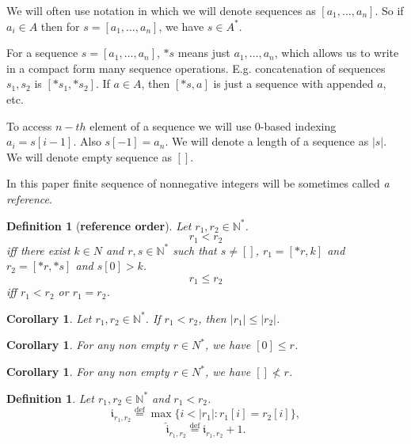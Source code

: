 \documentclass[10pt]{article}
\theoremstyle{plain}
\newtheorem{definition}[theorem]{Definition}
\newtheorem{corollary}[theorem]{Corollary}
\newcommand{\defeq}{\stackrel{\mathrm{def}}{=}}
\renewcommand{\i}{\mathfrak{i}}
\newcommand{\ii}{\hat{\mathfrak{i}}}
\newcommand{\N}{\mathbb{N}}
\begin{document}
We will often use notation in which we will denote sequences as $[a_1, \dots, a_n]$.
So if $a_i\in A$ then for $s=[a_1, \dots, a_n]$, we have $s\in A^*$. 

For a sequence $s=[a_1, \dots, a_n]$, $*s$ means just $a_1, \dots, a_n$, which allows us to write in a compact form many sequence operations. E.g. concatenation of sequences $s_1, s_2$ is $[*s_1, *s_2]$. If $a\in A$, then $[*s, a]$ is just a sequence with appended $a$, etc. 

To access $n-th$ element of a sequence we will use $0$-based indexing $a_i = s[i-1]$.
Also $s[-1] = a_n$.
We will denote a length of a sequence as $|s|$.
We will denote empty sequence as $[]$.

In this paper finite sequence of nonnegative integers will be sometimes called \textit{a reference}.   

\begin{definition}[\textbf{reference order}]
\label{reference-order}
Let $r_1, r_2\in \N^*$.
\begin{equation}
r_1 < r_2
\end{equation}
iff there exist $k \in N$ and $r, s\in\N^*$ such that $s\not=[]$, $r_1 = [*r, k]$ and $r_2 = [*r, *s]$ and $s[0] > k$.
\begin{equation}
r_1 \leq r_2
\end{equation}
iff $r_1 < r_2$ or $r_1 = r_2$.
\end{definition}

\begin{corollary}
Let $r_1, r_2\in \N^*$.
If $r_1 < r_2$, then $|r_1| \leq |r_2|$.
\end{corollary}

\begin{corollary}
For any non empty $r\in N^*$, we have $[0] \leq r$.
\end{corollary}

\begin{corollary}
For any non empty $r\in N^*$, we have $[] \not< r$.
\end{corollary}

\begin{definition}
Let $r_1, r_2\in\N^*$ and $r_1 < r_2$.
\begin{equation}
\i_{r_1, r_2} \defeq \max \{ i < |r_1| : r_1[i] = r_2[i] \},
\end{equation}
\begin{equation}
\ii_{r_1, r_2} \defeq \i_{r_1, r_2} + 1.
\end{equation}
\end{definition}
\end{document}
